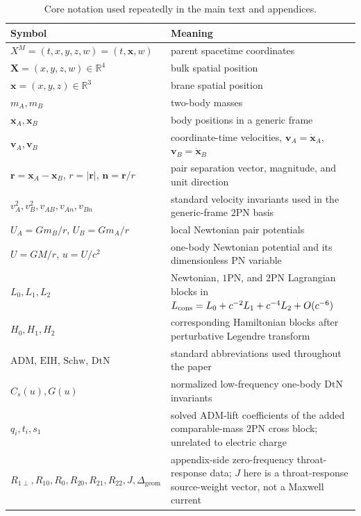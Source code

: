 \documentclass[11pt]{article}
\newcommand{\R}{\mathbb R}
\newcommand{\X}{\mathbf X}
\newcommand{\x}{\mathbf x}
\newcommand{\vct}{\mathbf v}
\newcommand{\nvec}{\mathbf n}
\newcommand{\OnePN}{\mathrm{1PN}}
\newcommand{\TwoPN}{\mathrm{2PN}}
\newcommand{\ADM}{\mathrm{ADM}}
\newcommand{\DtN}{\mathrm{DtN}}
\newcommand{\EIH}{\mathrm{EIH}}
\newcommand{\Schw}{\mathrm{Schw}}
\newcommand{\geom}{\mathrm{geom}}
\begin{document}
\begin{table}[t]
  \centering
  \caption{Core notation used repeatedly in the main text and appendices.}
  \label{tab:notation-core-2pn}
  \small
  \renewcommand{\arraystretch}{1.15}
  \begin{tabularx}{\linewidth}{@{}L L@{}}
    \toprule
    Symbol & Meaning \\
    \midrule
    \(X^M=(t,x,y,z,w)=(t,\x,w)\) & parent spacetime coordinates \\
    \(\X=(x,y,z,w)\in\R^4\) & bulk spatial position \\
    \(\x=(x,y,z)\in\R^3\) & brane spatial position \\
    \(m_A,m_B\) & two-body masses \\
    \(\mathbf x_A,\mathbf x_B\) & body positions in a generic frame \\
    \(\vct_A,\vct_B\) & coordinate-time velocities, \(\vct_A=\dot{\mathbf x}_A\), \(\vct_B=\dot{\mathbf x}_B\) \\
    \(\mathbf r=\mathbf x_A-\mathbf x_B\), \(r=|\mathbf r|\), \(\nvec=\mathbf r/r\) & pair separation vector, magnitude, and unit direction \\
    \(v_A^2, v_B^2, v_{AB}, v_{An}, v_{Bn}\) & standard velocity invariants used in the generic-frame \(\TwoPN\) basis \\
    \(U_A=Gm_B/r\), \(U_B=Gm_A/r\) & local Newtonian pair potentials \\
    \(U=GM/r\), \(u=U/c^2\) & one-body Newtonian potential and its dimensionless PN variable \\
    \(L_0,L_1,L_2\) & Newtonian, \(\OnePN\), and \(\TwoPN\) Lagrangian blocks in
    \(L_{\rm cons}=L_0+c^{-2}L_1+c^{-4}L_2+O(c^{-6})\) \\
    \(H_0,H_1,H_2\) & corresponding Hamiltonian blocks after perturbative Legendre transform \\
    \(\ADM\), \(\EIH\), \(\Schw\), \(\DtN\) & standard abbreviations used throughout the paper \\
    \(C_s(u),G(u)\) & normalized low-frequency one-body \(\DtN\) invariants \\
    \(q_i,t_i,s_1\) & solved \(\ADM\)-lift coefficients of the added comparable-mass \(\TwoPN\) cross block; unrelated to electric charge \\
    \(R_{1\perp},R_{10},R_0,R_{20},R_{21},R_{22},J,\Delta_{\geom}\) & appendix-side zero-frequency throat-response data; \(J\) here is a throat-response source-weight vector, not a Maxwell current \\
    \bottomrule
  \end{tabularx}
\end{table}
\end{document}
